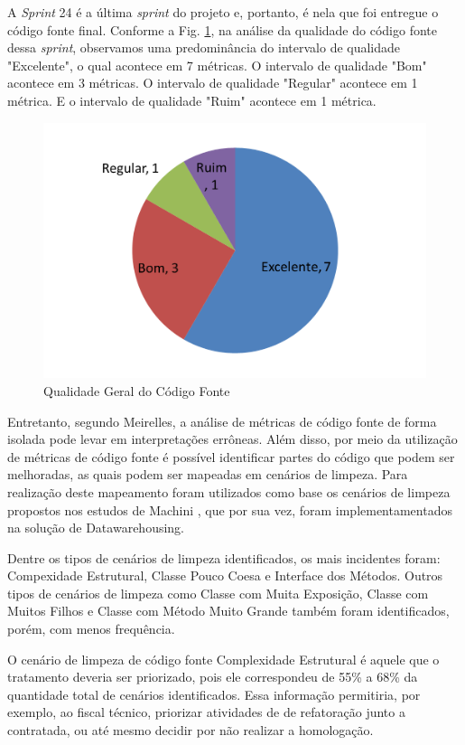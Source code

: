 A \textit{Sprint} 24 é a última \textit{sprint} do projeto e, portanto, é nela que foi entregue o código fonte final. Conforme a Fig. \ref{pizzatotal}, na análise da qualidade do código fonte dessa \textit{sprint}, observamos uma predominância do intervalo de qualidade "Excelente", o qual acontece em 7 métricas. O intervalo de qualidade "Bom" acontece em 3 métricas. O intervalo de qualidade "Regular" acontece em 1 métrica. E o intervalo de qualidade "Ruim" acontece em 1 métrica.

\begin{figure}[h]
		\centering
			\includegraphics[scale=0.5]{figuras/pizzatotal.png}
		\caption{Qualidade Geral do Código Fonte}
		\label{pizzatotal}
\end{figure}

Entretanto, segundo Meirelles, a análise de métricas de código fonte de forma isolada pode levar em interpretações errôneas. Além disso, por meio da utilização de métricas de código fonte é possível identificar partes do código que podem ser melhoradas, as quais podem ser mapeadas em cenários de limpeza. Para realização deste mapeamento foram utilizados como base os cenários de limpeza propostos nos estudos de Machini , que por sua vez, foram implementamentados na solução de Datawarehousing.

Dentre os tipos de cenários de limpeza identificados, os mais incidentes foram: 
Compexidade Estrutural, Classe Pouco Coesa e Interface dos Métodos. Outros tipos de cenários de limpeza como Classe com Muita Exposição, Classe
com Muitos Filhos e Classe com Método Muito Grande também foram identificados, porém, com menos frequência.

O cenário de limpeza de código fonte Complexidade Estrutural é aquele que o tratamento deveria
ser priorizado, pois ele correspondeu de 55\% a 68\% da quantidade total de cenários identificados. Essa informação permitiria, por exemplo, ao fiscal técnico, priorizar atividades de de refatoração junto  a contratada, ou até mesmo decidir por não realizar a homologação. 


